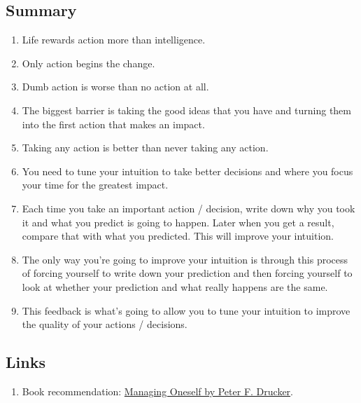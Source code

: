 \documentclass[a4paper,12pt]{article}
\begin{document}
\subsection*{ Summary }

\begin{enumerate}

	\item Life rewards action more than intelligence.

	\item Only action begins the change.

	\item Dumb action is worse than no action at all.

	\item The biggest barrier is taking the good ideas that you have and turning them into the first action that makes an impact.

	\item Taking any action is better than never taking any action.

	\item You need to tune your intuition to take better decisions and where you focus your time for the greatest impact.

	\item Each time you take an important action / decision, write down why you took it and what you predict is going to happen. Later when you get a result, compare that with what you predicted. This will improve your intuition.

	\item The only way you're going to improve your intuition is through this process of forcing yourself to write down your prediction and then forcing yourself to look at whether your prediction and what really happens are the same.

	\item This feedback is what's going to allow you to tune your intuition to improve the quality of your actions / decisions.

\end{enumerate}



\subsection*{ Links }

\begin{enumerate}

	\item Book recommendation: \href{https://www.goodreads.com/book/show/2477223.Managing_Oneself}{Managing Oneself by Peter F. Drucker}.

\end{enumerate}
\end{document}
